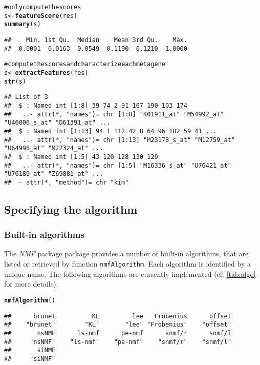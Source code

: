 \documentclass[a4paper]{article}\usepackage{graphicx, color}
\makeatletter
\newcommand{\hlfunctioncall}[1]{\textcolor[rgb]{0.501960784313725,0,0.329411764705882}{\textbf{#1}}}%
\newcommand{\hlcomment}[1]{\textcolor[rgb]{0.180392156862745,0.6,0.341176470588235}{#1}}%
\newenvironment{kframe}{%
 \def\at@end@of@kframe{}%
 \ifinner\ifhmode%
  \def\at@end@of@kframe{\end{minipage}}%
  \begin{minipage}{\columnwidth}%
 \fi\fi%
 \def\FrameCommand##1{\hskip\@totalleftmargin \hskip-\fboxsep
 \colorbox{shadecolor}{##1}\hskip-\fboxsep
     \hskip-\linewidth \hskip-\@totalleftmargin \hskip\columnwidth}%
 \MakeFramed {\advance\hsize-\width
   \@totalleftmargin\z@ \linewidth\hsize
   \@setminipage}}%
 {\par\unskip\endMakeFramed%
 \at@end@of@kframe}
\newenvironment{knitrout}{}{} %
\let\code=\texttt
\newcommand{\pkgname}[1]{\textit{#1}\xspace}
\newcommand{\Rpkg}[1]{\pkgname{#1} package\xspace}
\newcommand{\nmfpack}{\Rpkg{NMF}}
\makeatother
\begin{document}
\begin{knitrout}
\color{fgcolor}\begin{kframe}
\begin{alltt}
\hlcomment{# only compute the scores}
s <- \hlfunctioncall{featureScore}(res)
\hlfunctioncall{summary}(s)
\end{alltt}
\begin{verbatim}
##    Min. 1st Qu.  Median    Mean 3rd Qu.    Max. 
##  0.0001  0.0163  0.0549  0.1190  0.1210  1.0000
\end{verbatim}
\begin{alltt}

\hlcomment{# compute the scores and characterize each metagene}
s <- \hlfunctioncall{extractFeatures}(res)
\hlfunctioncall{str}(s)
\end{alltt}
\begin{verbatim}
## List of 3
##  $ : Named int [1:8] 39 74 2 91 167 190 103 174
##   ..- attr(*, "names")= chr [1:8] "K01911_at" "M54992_at" "U46006_s_at" "D61391_at" ...
##  $ : Named int [1:13] 94 1 112 42 8 64 96 182 59 41 ...
##   ..- attr(*, "names")= chr [1:13] "M23178_s_at" "M12759_at" "U64998_at" "M22324_at" ...
##  $ : Named int [1:5] 43 120 128 130 129
##   ..- attr(*, "names")= chr [1:5] "M16336_s_at" "U76421_at" "U76189_at" "Z69881_at" ...
##  - attr(*, "method")= chr "kim"
\end{verbatim}
\end{kframe}
\end{knitrout}


\subsection{Specifying the algorithm}\label{sec:algo}

\subsubsection{Built-in algorithms}
The \nmfpack package provides a number of built-in algorithms, that are listed or retrieved by function \code{nmfAlgorithm}. 
Each algorithm is identified by a unique name.
The following algorithms are currently implemented (cf. \cref{tab:algo} for more details):

\begin{knitrout}
\color{fgcolor}\begin{kframe}
\begin{alltt}
\hlfunctioncall{nmfAlgorithm}()
\end{alltt}
\begin{verbatim}
##      brunet          KL         lee   Frobenius      offset 
##    "brunet"        "KL"       "lee" "Frobenius"    "offset" 
##       nsNMF      ls-nmf      pe-nmf      snmf/r      snmf/l 
##     "nsNMF"    "ls-nmf"    "pe-nmf"    "snmf/r"    "snmf/l" 
##       siNMF 
##     "siNMF"
\end{verbatim}
\end{kframe}
\end{knitrout}
\end{document}
